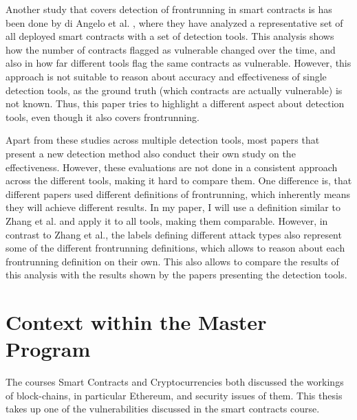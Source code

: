 \documentclass[paper=a4,fontsize=11pt,oneside,titlepage]{scrartcl}
\begin{document}
Another study that covers detection of frontrunning in smart contracts is has been done by di Angelo et al. \cite{di_angelo_evolution_2023}, where they have analyzed a representative set of all deployed smart contracts with a set of detection tools. This analysis shows how the number of contracts flagged as vulnerable changed over the time, and also in how far different tools flag the same contracts as vulnerable. However, this approach is not suitable to reason about accuracy and effectiveness of single detection tools, as the ground truth (which contracts are actually vulnerable) is not known. Thus, this paper tries to highlight a different aspect about detection tools, even though it also covers frontrunning.

Apart from these studies across multiple detection tools, most papers that present a new detection method also conduct their own study on the effectiveness. However, these evaluations are not done in a consistent approach across the different tools, making it hard to compare them. One difference is, that different papers used different definitions of frontrunning, which inherently means they will achieve different results. In my paper, I will use a definition similar to Zhang et al.\cite{zhang_combatting_2023} and apply it to all tools, making them comparable. However, in contrast to Zhang et al., the labels defining different attack types also represent some of the different frontrunning definitions, which allows to reason about each frontrunning definition on their own. This also allows to compare the results of this analysis with the results shown by the papers presenting the detection tools.


\iffalse
\begin{itemize}
\item What are the existing approaches addressing similar problems? (Include at least 4 references.)
\item What makes the thesis different? How does it go beyond the state of the art?
\end{itemize}
\fi

\section{Context within the Master Program}
\label{sec:masterProgram}

The courses Smart Contracts and Cryptocurrencies both discussed the workings of block\hyp{}chains, in particular Ethereum, and security issues of them. This thesis takes up one of the vulnerabilities discussed in the smart contracts course.
\end{document}
